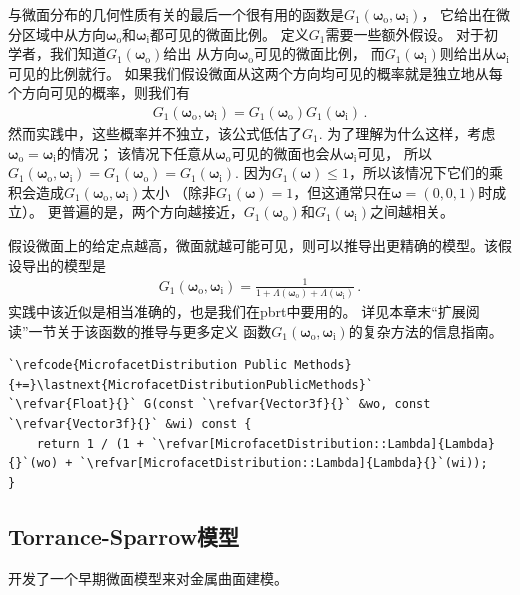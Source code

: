 与微面分布的几何性质有关的最后一个很有用的函数是$G_1({\bm\omega}_{\mathrm{o}},{\bm\omega}_{\mathrm{i}})$，
它给出在微分区域中从方向${\bm\omega}_{\mathrm{o}}$和${\bm\omega}_{\mathrm{i}}$都可见的微面比例。
定义$G_1$需要一些额外假设。
对于初学者，我们知道$G_1({\bm\omega}_{\mathrm{o}})$给出
从方向${\bm\omega}_{\mathrm{o}}$可见的微面比例，
而$G_1({\bm\omega}_{\mathrm{i}})$则给出从${\bm\omega}_{\mathrm{i}}$可见的比例就行。
如果我们假设微面从这两个方向均可见的概率就是独立地从每个方向可见的概率，则我们有
\begin{align*}
    G_1({\bm\omega}_{\mathrm{o}},{\bm\omega}_{\mathrm{i}})=G_1({\bm\omega}_{\mathrm{o}})G_1({\bm\omega}_{\mathrm{i}})\, .
\end{align*}
然而实践中，这些概率并不独立，该公式低估了$G_1$.
为了理解为什么这样，考虑${\bm\omega}_{\mathrm{o}}={\bm\omega}_{\mathrm{i}}$的情况；
该情况下任意从${\bm\omega}_{\mathrm{o}}$可见的微面也会从${\bm\omega}_{\mathrm{i}}$可见，
所以$G_1({\bm\omega}_{\mathrm{o}},{\bm\omega}_{\mathrm{i}})=G_1({\bm\omega}_{\mathrm{o}})=G_1({\bm\omega}_{\mathrm{i}})$.
因为$G_1({\bm\omega})\le 1$，所以该情况下它们的乘积会造成$G_1({\bm\omega}_{\mathrm{o}},{\bm\omega}_{\mathrm{i}})$太小
（除非$G_1({\bm\omega})=1$，但这通常只在${\bm\omega}=(0,0,1)$时成立）。
更普遍的是，两个方向越接近，$G_1({\bm\omega}_{\mathrm{o}})$和$G_1({\bm\omega}_{\mathrm{i}})$之间越相关。

假设微面上的给定点越高，微面就越可能可见，则可以推导出更精确的模型。该假设导出的模型是
\begin{align*}
    G_1({\bm\omega}_{\mathrm{o}},{\bm\omega}_{\mathrm{i}})=\frac{1}{1+\Lambda({\bm\omega}_{\mathrm{o}})+\Lambda({\bm\omega}_{\mathrm{i}})}\, .
\end{align*}
实践中该近似是相当准确的，也是我们在pbrt中要用的。
详见本章末“扩展阅读”一节关于该函数的推导与更多定义
函数$G_1({\bm\omega}_{\mathrm{o}},{\bm\omega}_{\mathrm{i}})$的复杂方法的信息指南。
\begin{lstlisting}
`\refcode{MicrofacetDistribution Public Methods}{+=}\lastnext{MicrofacetDistributionPublicMethods}`
`\refvar{Float}{}` G(const `\refvar{Vector3f}{}` &wo, const `\refvar{Vector3f}{}` &wi) const {
    return 1 / (1 + `\refvar[MicrofacetDistribution::Lambda]{Lambda}{}`(wo) + `\refvar[MicrofacetDistribution::Lambda]{Lambda}{}`(wi));
}
\end{lstlisting}

\subsection{Torrance-Sparrow模型}\label{sub:Torrance-Sparrow模型}
\citet{Torrance:67}开发了一个早期微面模型来对金属曲面建模。